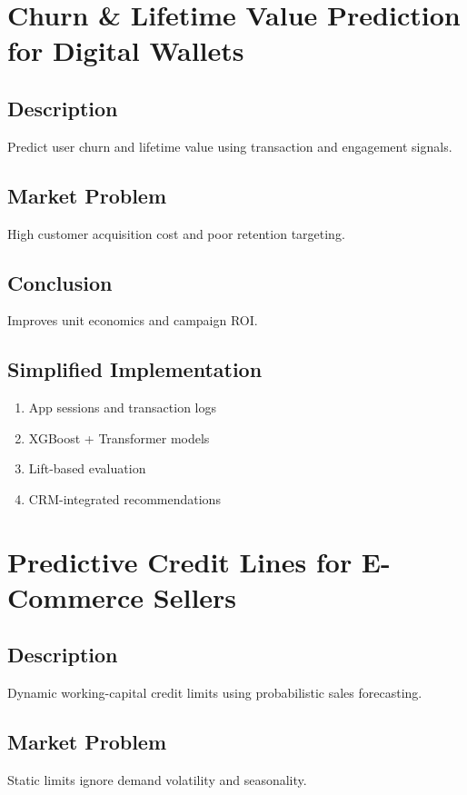 \documentclass[11pt,a4paper]{article}
\begin{document}
\section{Churn \& Lifetime Value Prediction for Digital Wallets}

\subsection*{Description}
Predict user churn and lifetime value using transaction and engagement signals.

\subsection*{Market Problem}
High customer acquisition cost and poor retention targeting.

\subsection*{Conclusion}
Improves unit economics and campaign ROI.

\subsection*{Simplified Implementation}
\begin{enumerate}[noitemsep]
    \item App sessions and transaction logs
    \item XGBoost + Transformer models
    \item Lift-based evaluation
    \item CRM-integrated recommendations
\end{enumerate}

\section{Predictive Credit Lines for E-Commerce Sellers}

\subsection*{Description}
Dynamic working-capital credit limits using probabilistic sales forecasting.

\subsection*{Market Problem}
Static limits ignore demand volatility and seasonality.
\end{document}
